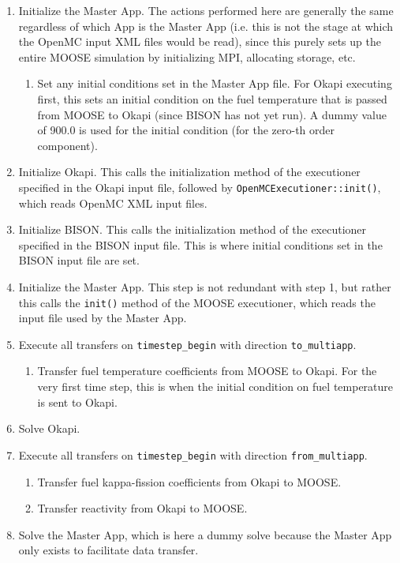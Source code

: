 \documentclass[10pt]{article}
\numberwithin{equation}{section} %
\begin{document}
\begin{enumerate}
\item Initialize the Master App. The actions performed here are generally the same regardless of which App is the Master App (i.e. this is not the stage at which the OpenMC input XML files would be read), since this purely sets up the entire MOOSE simulation by initializing MPI, allocating storage, etc. 
	\begin{enumerate}
	\item Set any initial conditions set in the Master App file. For Okapi executing first, this sets an initial condition on the fuel temperature that is passed from MOOSE to Okapi (since BISON has not yet run). A dummy value of 900.0 is used for the initial condition (for the zero-th order component).
	\end{enumerate}
\item Initialize Okapi. This calls the initialization method of the executioner specified in the Okapi input file, followed by {\tt OpenMCExecutioner::init()}, which reads OpenMC XML input files.
\item Initialize BISON. This calls the initialization method of the executioner specified in the BISON input file. This is where initial conditions set in the BISON input file are set.
%
\item Initialize the Master App. This step is not redundant with step 1, but rather this calls the {\tt init()} method of the MOOSE executioner, which reads the input file used by the Master App.
%
\item Execute all transfers on {\tt timestep\_begin} with direction {\tt to\_multiapp}.
	\begin{enumerate}
	\item Transfer fuel temperature coefficients from MOOSE to Okapi. For the very first time step, this is when the initial condition on fuel temperature is sent to Okapi.
	\end{enumerate}
\item Solve Okapi.
\item Execute all transfers on {\tt timestep\_begin} with direction {\tt from\_multiapp}.
	\begin{enumerate}
	\item Transfer fuel kappa-fission coefficients from Okapi to MOOSE.	
	\item Transfer reactivity from Okapi to MOOSE.
    \end{enumerate}
\item Solve the Master App, which is here a dummy solve because the Master App only exists to facilitate data transfer.

\end{enumerate}
\end{document}
